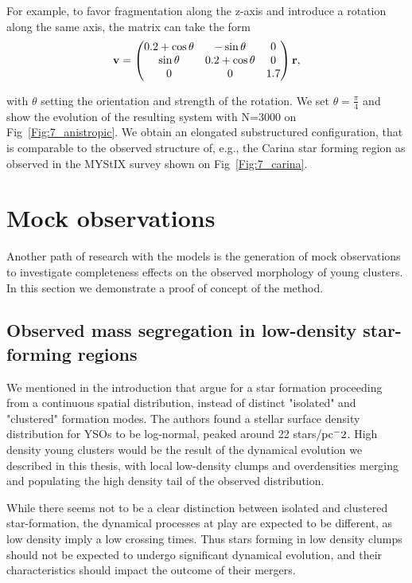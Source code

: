 For example, to favor fragmentation along the z-axis and introduce a rotation along the same axis, the matrix can take the form
\begin{equation}
\bold{v} = \left(\begin{matrix}
0.2 + \cos \theta &  -\sin \theta & 0\\
\sin \theta & 0.2 + \cos \theta & 0 \\
0  & 0 & 1.7\\
\end{matrix}\right) \bold{r},
\end{equation}

with $\theta$ setting the orientation and strength of the rotation. We set $\theta = \frac{\pi}{4}$ and show the evolution of the resulting system with N=3000 on Fig~\ref{Fig:7_anistropic}. We obtain an elongated substructured configuration, that is comparable to the observed structure of, e.g., the Carina star forming region as observed in the MYStIX survey \citep{Kuhn2014} shown on Fig~\ref{Fig:7_carina}.



\section{Mock observations}

Another path of research with the \HubLem models is the generation of mock observations to investigate completeness effects on the observed morphology of young clusters. In this section we demonstrate a proof of concept of the method.

\subsection*{Observed mass segregation in low-density star-forming regions}

We mentioned in the introduction that \cite{Bressert2010} argue for a star formation proceeding from a continuous spatial distribution, instead of distinct "isolated" and "clustered" formation modes. The authors found a stellar surface density distribution for YSOs to be log-normal, peaked around 22 stars/${\textrm{pc}}^-2$.  High density young clusters would be the result of the dynamical evolution we described in this thesis, with local low-density clumps and overdensities merging and populating the high density tail of the observed distribution.

While there seems not to be a clear distinction between isolated and clustered star-formation, the dynamical processes at play are expected to be different, as low density imply a low crossing times. Thus stars forming in low density clumps should not be expected to undergo significant dynamical evolution, and their characteristics should impact the outcome of their mergers.

